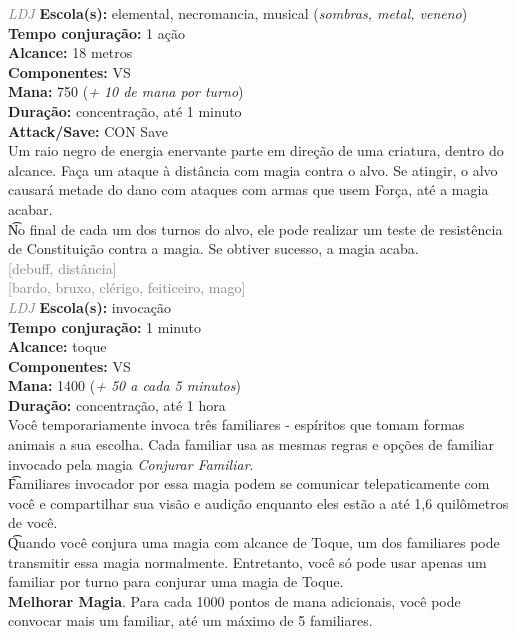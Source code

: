 \documentclass{RPG_Adventure}[2021/10/20]
\begin{document}
{\tiny \textcolor{gray}{\textit{LDJ}}}
{\small \t \textbf{Escola(s):} elemental, necromancia, musical (\textit{sombras, metal, veneno})\\\t \textbf{Tempo conjuração:} 1 ação\\\t \textbf{Alcance:} 18 metros\\\t \textbf{Componentes:} VS\\\t \textbf{Mana:} 750 (\textit{+ 10 de mana por turno})\\\t \textbf{Duração:} concentração, até 1 minuto\\\t \textbf{Attack/Save:} CON Save\\}
{\normalsize Um raio negro de energia enervante parte em direção de uma criatura, dentro do alcance. Faça um ataque à distância com magia contra o alvo. Se atingir, o alvo causará metade do dano com ataques com armas que usem Força, até a magia acabar.\\\t No final de cada um dos turnos do alvo, ele pode realizar um teste de resistência de Constituição contra a magia. Se obtiver sucesso, a magia acaba.\\}
{\scriptsize \textcolor{gray}{[debuff, distância]\\}}
{\scriptsize \textcolor{gray}{[bardo, bruxo, clérigo, feiticeiro, mago]\\}}
{\tiny \textcolor{gray}{\textit{LDJ}}}
{\small \t \textbf{Escola(s):} invocação\\\t \textbf{Tempo conjuração:} 1 minuto\\\t \textbf{Alcance:} toque\\\t \textbf{Componentes:} VS\\\t \textbf{Mana:} 1400 (\textit{+ 50 a cada 5 minutos})\\\t \textbf{Duração:} concentração, até 1 hora\\}
{\normalsize Você temporariamente invoca três familiares - espíritos que tomam formas animais a sua escolha. Cada familiar usa as mesmas regras e opções de familiar invocado pela magia \textit{Conjurar Familiar}.\\\t Familiares invocador por essa magia podem se comunicar telepaticamente com você e compartilhar sua visão e audição enquanto eles estão a até 1,6 quilômetros de você.\\\t Quando você conjura uma magia com alcance de Toque, um dos familiares pode transmitir essa magia normalmente. Entretanto, você só pode usar apenas um familiar por turno para conjurar uma magia de Toque.\\\t \textbf{Melhorar Magia}. Para cada 1000 pontos de mana adicionais, você pode convocar mais um familiar, até um máximo de 5 familiares.\\}
\end{document}
